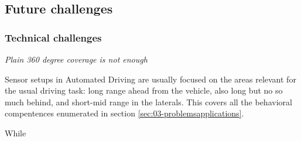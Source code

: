 


\subsection{Future challenges}



\subsubsection{Technical challenges}


\emph{Plain 360 degree coverage is not enough}

Sensor setups in Automated Driving are usually focused on the areas
relevant for the usual driving task: long range ahead from the vehicle, also 
long but no so much behind, and short-mid range in the laterals. This covers 
all the behavioral compentences enumerated in section 
\ref{sec:03-problemsapplications}.

While 

